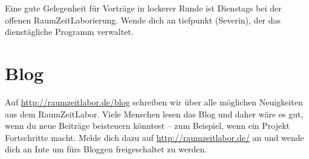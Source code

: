 \documentclass[12pt, DIV16, a4paper]{scrartcl}
\begin{document}
Eine gute Gelegenheit für Vorträge in lockerer Runde ist Dienstags bei der
offenen RaumZeitLaborierung. Wende dich an tiefpunkt (Severin), der das
dienstägliche Programm verwaltet.

\section*{Blog}

Auf \url{http://raumzeitlabor.de/blog} schreiben wir über alle möglichen
Neuigkeiten aus dem RaumZeitLabor. Viele Menschen lesen das Blog und daher wäre
es gut, wenn du neue Beiträge beisteuern könntest -- zum Beispiel, wenn ein
Projekt Fortschritte macht. Melde dich dazu auf \url{http://raumzeitlabor.de/}
an und wende dich an Inte um fürs Bloggen freigeschaltet zu werden.
\end{document}
